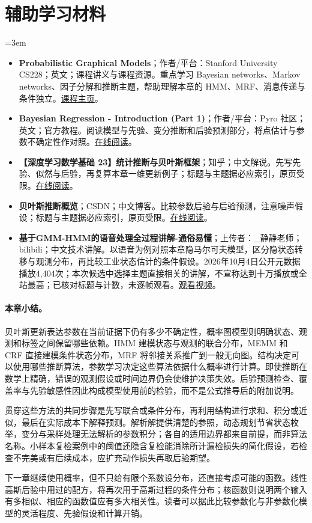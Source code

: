 \section*{辅助学习材料}
\begingroup
\emergencystretch=3em
\begin{itemize}
\item \textbf{Probabilistic Graphical Models}；作者/平台：Stanford University CS228；英文；课程讲义与课程资源。重点学习 Bayesian networks、Markov networks、因子分解和推断主题，帮助理解本章的 HMM、MRF、消息传递与条件独立。\href{https://ermongroup.github.io/cs228/}{课程主页}。
\item \textbf{Bayesian Regression - Introduction (Part 1)}；作者/平台：Pyro 社区；英文；官方教程。阅读模型与先验、变分推断和后验预测部分，将点估计与参数不确定性作对照。\href{https://pyro.ai/examples/bayesian\_regression.html}{在线阅读}。
\item \textbf{【深度学习数学基础 23】统计推断与贝叶斯框架}；知乎；中文解说。先写先验、似然与后验，再复算本章一维更新例子；标题与主题据必应索引，原页受限。\href{https://zhuanlan.zhihu.com/p/1910026999415673453}{在线阅读}。
\item \textbf{贝叶斯推断概览}；CSDN；中文博客。比较参数后验与后验预测，注意噪声假设；标题与主题据必应索引，原页受限。\href{https://blog.csdn.net/qq\_41282102/article/details/84928605}{在线阅读}。
\item \textbf{基于GMM-HMM的语音处理全过程讲解-通俗易懂}；上传者：\_静静老师；bilibili；中文技术讲解。以语音为例对照本章隐马尔可夫模型，区分隐状态转移与观测分布，再比较工业状态估计的条件假设。2026年10月4日公开元数据播放4,404次；本次候选中选择主题直接相关的讲解，不宣称达到十万播放或全站最高；已核对标题与计数，未逐帧观看。\href{https://www.bilibili.com/video/BV1Rv4y1c7SA/}{观看视频}。
\end{itemize}
\endgroup
\paragraph{本章小结。}
贝叶斯更新表达参数在当前证据下仍有多少不确定性，概率图模型则明确状态、观测和标签之间保留哪些依赖。HMM 建模状态与观测的联合分布，MEMM 和 CRF 直接建模条件状态分布，MRF 将邻接关系推广到一般无向图。结构决定可以使用哪些推断算法，参数学习决定这些算法依据什么概率进行计算。即使推断在数学上精确，错误的观测假设或时间边界仍会使维护决策失效。后验预测检查、覆盖率与先验敏感性因此构成模型使用前的检验，而不是公式推导后的附加说明。

贯穿这些方法的共同步骤是先写联合或条件分布，再利用结构进行求和、积分或近似，最后在实际成本下解释预测。解析解提供清楚的参照，动态规划节省状态枚举，变分与采样处理无法解析的参数积分；各自的适用边界都来自前提，而非算法名称。小样本复检案例中的阈值还隐含复检能消除所计漏检损失的简化假设，若检查不完美或有后续成本，应扩充动作损失再取后验期望。

下一章继续使用概率，但不只给有限个系数设分布，还直接考虑可能的函数。线性高斯后验中用过的配方，将再次用于高斯过程的条件分布；核函数则说明两个输入有多相似、相应的函数值应有多大相关性。读者可以据此比较参数化与非参数化模型的灵活程度、先验假设和计算开销。
